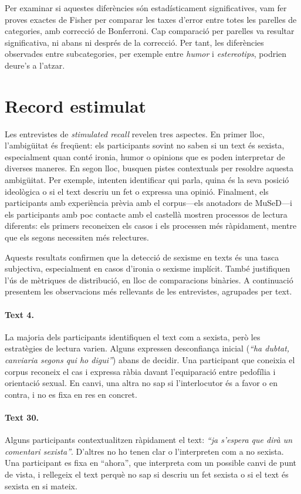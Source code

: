 Per examinar si aquestes diferències són estadísticament significatives, vam fer proves exactes de Fisher per comparar les taxes d'error entre totes les parelles de categories, amb correcció de Bonferroni.
Cap comparació per parelles va resultar significativa, ni abans ni després de la correcció.
Per tant, les diferències observades entre subcategories, per exemple entre \textit{humor} i \textit{estereotips}, podrien deure's a l'atzar.

\section{Record estimulat}

Les entrevistes de \textit{stimulated recall} revelen tres aspectes.
En primer lloc, l'ambigüitat és freqüent: els participants sovint no saben si un text és sexista, especialment quan conté ironia, humor o opinions que es poden interpretar de diverses maneres.
En segon lloc, busquen pistes contextuals per resoldre aquesta ambigüitat. Per exemple, intenten identificar qui parla, quina és la seva posició ideològica o si el text descriu un fet o expressa una opinió.
Finalment, els participants amb experiència prèvia amb el corpus---els anotadors de MuSeD---i els participants amb poc contacte amb el castellà mostren processos de lectura diferents: els primers reconeixen els casos i els processen més ràpidament, mentre que els segons necessiten més relectures.

Aquests resultats confirmen que la detecció de sexisme en texts és una tasca subjectiva, especialment en casos d'ironia o sexisme implícit. També justifiquen l'ús de mètriques de distribució, en lloc de comparacions binàries.
A continuació presentem les observacions més rellevants de les entrevistes, agrupades per text.

\paragraph{Text 4.}
La majoria dels participants identifiquen el text com a sexista, però les estratègies de lectura varien.
Alguns expressen desconfiança inicial (\textit{``ha dubtat, canviaria segons qui ho digui''}) abans de decidir.
Una participant que coneixia el corpus reconeix el cas i expressa ràbia davant l'equiparació entre pedofília i orientació sexual.
En canvi, una altra no sap si l'interlocutor és a favor o en contra, i no es fixa en res en concret.

\paragraph{Text 30.}
Alguns participants contextualitzen ràpidament el text: \textit{``ja s'espera que dirà un comentari sexista''}.
D'altres no ho tenen clar o l'interpreten com a no sexista.
Una participant es fixa en ``ahora'', que interpreta com un possible canvi de punt de vista, i rellegeix el text perquè no sap si descriu un fet sexista o si el text és sexista en si mateix.

